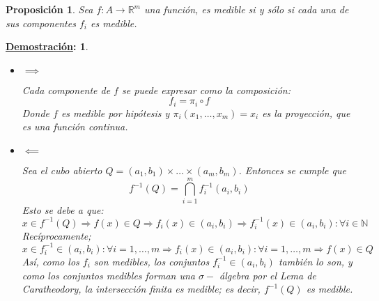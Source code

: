 \documentclass[10pt,a4paper,openright]{book}
\theoremstyle{break}
\newtheorem*{prop}{Proposición}
\newtheorem*{demo}{\underline{Demostración}:}
\begin{document}
\begin{prop}
Sea $f: A \to \mathbb{R}^m$ una función, es medible si y sólo si cada una de sus componentes $f_i$ es medible.
\end{prop}
\begin{demo}
\begin{itemize}
\item $\implies$

Cada componente de $f$ se puede expresar como la composición:
$$f_i = \pi_i \circ f$$
Donde $f$ es medible por hipótesis y $\pi_i\left( x_1, \ldots, x_m \right) = x_i$ es la proyección, que es una función continua.

\item $\impliedby$

Sea el cubo abierto $Q = \left( a_1, b_1 \right) \times \ldots \times \left( a_m, b_m \right)$. Entonces se cumple que 
$$f^{-1}\left( Q \right) = \bigcap_{i = 1}^{m} f_i^{-1}\left( a_i, b_i \right)$$
Esto se debe a que:
$$x \in f^{-1}\left( Q \right) \Rightarrow f\left( x \right) \in Q \Rightarrow f_i\left( x \right) \in \left( a_i, b_i \right) \Rightarrow  f_i^{-1} \left( x \right) \in \left( a_i, b_i \right) : \forall i \in \mathbb{N}$$
Recíprocamente;
$$x \in f_i^{-1} \in \left( a_i, b_i \right) : \forall i = 1, \ldots, m \Rightarrow f_i \left( x \right) \in \left( a_i, b_i \right) : \forall i = 1, \ldots, m \Rightarrow f(x) \in Q$$
Así, como los $f_i$ son medibles, los conjuntos $f_i^{-1} \in \left( a_i, b_i \right)$ también lo son, y como los conjuntos medibles forman una $\sigma -$ álgebra por el Lema de Caratheodory, la intersección finita es medible; es decir, $f^{-1}(Q)$ es medible.
\end{itemize}
\end{demo}
\end{document}
